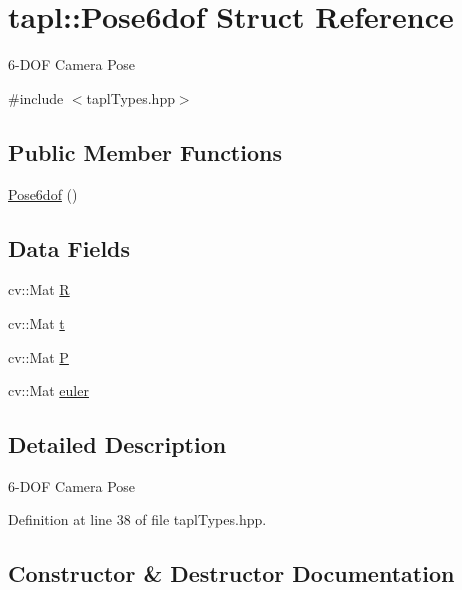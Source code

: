 \hypertarget{structtapl_1_1Pose6dof}{}\section{tapl\+:\+:Pose6dof Struct Reference}
\label{structtapl_1_1Pose6dof}


6-\/\+D\+OF Camera Pose  




{\ttfamily \#include $<$tapl\+Types.\+hpp$>$}

\subsection*{Public Member Functions}
\begin{DoxyCompactItemize}
\item 
\hyperlink{structtapl_1_1Pose6dof_a48869500ca9d0fe0e2936132eaec566e}{Pose6dof} ()
\end{DoxyCompactItemize}
\subsection*{Data Fields}
\begin{DoxyCompactItemize}
\item 
cv\+::\+Mat \hyperlink{structtapl_1_1Pose6dof_a0ff2d0d3cb7c4d1cb83ffd8545dbbfa0}{R}
\item 
cv\+::\+Mat \hyperlink{structtapl_1_1Pose6dof_aaac0151b90bd28d462e400e5b5dbefcb}{t}
\item 
cv\+::\+Mat \hyperlink{structtapl_1_1Pose6dof_a2cc91e38bb0080f6e1760902613cc093}{P}
\item 
cv\+::\+Mat \hyperlink{structtapl_1_1Pose6dof_afa5dd6803d0f682139676e27ff20b9d2}{euler}
\end{DoxyCompactItemize}


\subsection{Detailed Description}
6-\/\+D\+OF Camera Pose 

Definition at line 38 of file tapl\+Types.\+hpp.



\subsection{Constructor \& Destructor Documentation}
